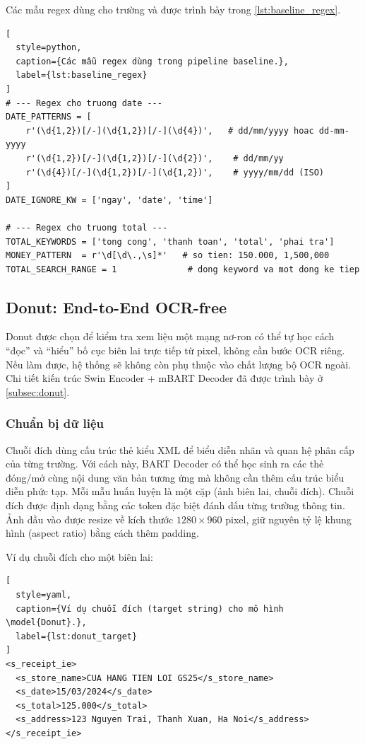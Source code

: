 Các mẫu regex dùng cho trường  và  được
trình bày trong \cref{lst:baseline_regex}.

\begin{lstlisting}[
  style=python,
  caption={Các mẫu regex dùng trong pipeline baseline.},
  label={lst:baseline_regex}
]
# --- Regex cho truong date ---
DATE_PATTERNS = [
    r'(\d{1,2})[/-](\d{1,2})[/-](\d{4})',   # dd/mm/yyyy hoac dd-mm-yyyy
    r'(\d{1,2})[/-](\d{1,2})[/-](\d{2})',    # dd/mm/yy
    r'(\d{4})[/-](\d{1,2})[/-](\d{1,2})',    # yyyy/mm/dd (ISO)
]
DATE_IGNORE_KW = ['ngay', 'date', 'time']

# --- Regex cho truong total ---
TOTAL_KEYWORDS = ['tong cong', 'thanh toan', 'total', 'phai tra']
MONEY_PATTERN  = r'\d[\d\.,\s]*'   # so tien: 150.000, 1,500,000
TOTAL_SEARCH_RANGE = 1              # dong keyword va mot dong ke tiep
\end{lstlisting}


\subsection{Donut: End-to-End OCR-free}
\label{subsec:donut_methodology}


Donut được chọn để kiểm tra xem liệu một mạng nơ-ron có thể tự học cách ``đọc'' và ``hiểu'' bố cục biên lai trực tiếp từ pixel, không cần bước OCR riêng. Nếu làm được, hệ thống sẽ không còn phụ thuộc vào chất lượng bộ OCR ngoài. Chi tiết kiến trúc Swin Encoder + mBART Decoder đã được trình bày ở \cref{subsec:donut}.


\subsubsection{Chuẩn bị dữ liệu}
\label{subsubsec:donut_data}

Chuỗi đích dùng cấu trúc thẻ kiểu XML để biểu diễn nhãn và quan hệ phân cấp của từng trường. Với cách này, BART Decoder có thể học sinh ra các thẻ đóng/mở cùng nội dung văn bản tương ứng mà không cần thêm cấu trúc biểu diễn phức tạp.
Mỗi mẫu huấn luyện là một cặp (ảnh biên lai, chuỗi đích). Chuỗi đích được
định dạng bằng các token đặc biệt đánh dấu từng trường thông tin. Ảnh đầu vào
được resize về kích thước $1280 \times 960$ pixel, giữ nguyên tỷ lệ khung hình
(aspect ratio) bằng cách thêm padding.

Ví dụ chuỗi đích cho một biên lai:

\begin{lstlisting}[
  style=yaml,
  caption={Ví dụ chuỗi đích (target string) cho mô hình \model{Donut}.},
  label={lst:donut_target}
]
<s_receipt_ie>
  <s_store_name>CUA HANG TIEN LOI GS25</s_store_name>
  <s_date>15/03/2024</s_date>
  <s_total>125.000</s_total>
  <s_address>123 Nguyen Trai, Thanh Xuan, Ha Noi</s_address>
</s_receipt_ie>
\end{lstlisting}

